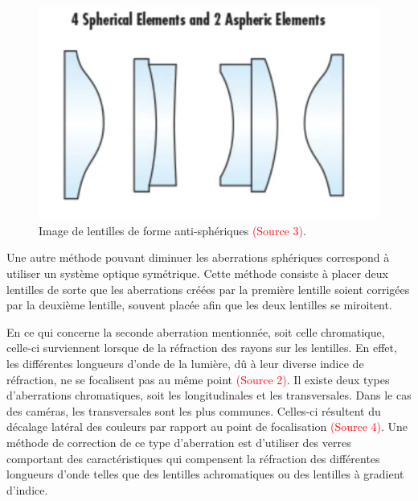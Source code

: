 \documentclass[11pt,letterpaper]{article}
\begin{document}
\begin{figure}[H]
  \centering
  \includegraphics[scale=0.4]{lentilles_aspherique.png}
  \caption{Image de lentilles de forme anti-sphériques \textcolor{red}{(Source 3)}.}
  \label{lentilles_antisph}
\end{figure}

Une autre méthode pouvant diminuer les aberrations sphériques correspond à utiliser un système optique symétrique. Cette méthode consiste à placer deux lentilles de sorte que les aberrations créées par la première lentille soient corrigées par la deuxième lentille, souvent placée afin que les deux lentilles se miroitent.

En ce qui concerne la seconde aberration mentionnée, soit celle chromatique, celle-ci surviennent lorsque de la réfraction des rayons sur les lentilles. En effet, les différentes longueurs d'onde de la lumière, dû à leur diverse indice de réfraction, ne se focalisent pas au même point \textcolor{red}{(Source 2)}. Il existe deux types d'aberrations chromatiques, soit les longitudinales et les transversales. Dans le cas des caméras, les transversales sont les plus communes. Celles-ci résultent du décalage latéral des couleurs par rapport au point de focalisation \textcolor{red}{(Source 4)}. Une méthode de correction de ce type d'aberration est d'utiliser des verres comportant des caractéristiques qui compensent la réfraction des différentes longueurs d'onde telles que des lentilles achromatiques ou des lentilles à gradient d'indice.


\end{document}
